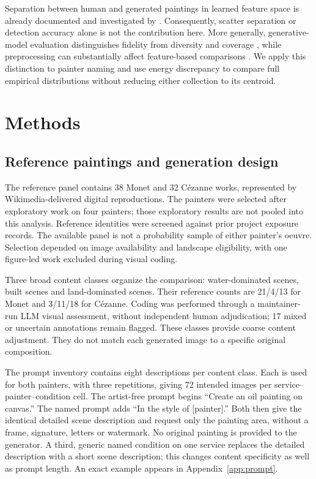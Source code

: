 \documentclass[11pt]{article}
\begin{document}
Separation between human and generated paintings in learned feature space is
already documented and investigated by \citet{asperti2026}. Consequently,
scatter separation or detection accuracy alone is not the contribution here.
More generally, generative-model evaluation distinguishes fidelity from diversity
and coverage \citep{naeem2020}, while preprocessing can substantially affect
feature-based comparisons \citep{parmar2022}. We apply this distinction to
painter naming and use energy discrepancy \citep{szekely2013} to compare full
empirical distributions without reducing either collection to its centroid.

\section{Methods}
\subsection{Reference paintings and generation design}
The reference panel contains 38 Monet and 32 C\'ezanne works, represented by
Wikimedia-delivered digital reproductions. The painters were selected after
exploratory work on four painters; those exploratory results are not pooled
into this analysis. Reference identities were screened against prior project
exposure records. The available panel is not a probability sample of either
painter's oeuvre. Selection depended on image availability and landscape
eligibility, with one figure-led work excluded during visual coding.

Three broad content classes organize the comparison: water-dominated scenes,
built scenes and land-dominated scenes. Their reference counts are 21/4/13 for
Monet and 3/11/18 for C\'ezanne. Coding was performed through a maintainer-run LLM
visual assessment, without independent human adjudication; 17 mixed or uncertain
annotations remain flagged. These classes provide coarse content adjustment.
They do not match each generated image to a specific original composition.

The prompt inventory contains eight descriptions per content class. Each is used
for both painters, with three repetitions, giving 72 intended images per
service--painter--condition cell. The artist-free prompt begins ``Create an oil
painting on canvas.'' The named prompt adds ``In the style of [painter].'' Both
then give the identical detailed scene description and request only the painting
area, without a frame, signature, letters or watermark. No original painting is
provided to the generator. A third, generic named condition on one service
replaces the detailed description with a short scene description; this changes
content specificity as well as prompt length. An exact example appears in
Appendix~\ref{app:prompt}.
\end{document}
